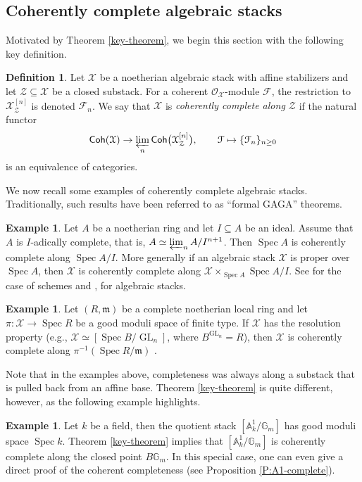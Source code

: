 \documentclass[a4paper]{amsart}
\theoremstyle{plain}
\theoremstyle{definition}
\newtheorem{definition}[theorem]{Definition}
\newtheorem{example}[theorem]{Example}
\theoremstyle{remark}
\numberwithin{equation}{section}
\newcommand{\sF}{\mathcal{F}} %
\newcommand{\fm}{\mathfrak{m}}
\newcommand{\GG}{\mathbb{G}}
\renewcommand\AA{\mathbb{A}}
\newcommand\cF{\mathcal{F}}
\newcommand\cX{\mathcal{X}}
\newcommand\cZ{\mathcal{Z}}
\newcommand\oh{\mathcal{O}}
\newcommand\Coh{\mathsf{Coh}}
\DeclareMathOperator{\Spec}{Spec}
\DeclareMathOperator{\GL}{GL}
\newcommand{\ilim}{\varprojlim}
\begin{document}
\subsection{Coherently complete algebraic stacks} \label{S:cc}
Motivated by Theorem \ref{key-theorem}, we begin this section with the following key definition. 
\begin{definition} \label{D:cc}
Let $\cX$ be a noetherian algebraic stack with affine stabilizers and let $\cZ \subseteq \cX$ be a closed substack. For a coherent $\oh_\cX$-module $\sF$, the restriction to $\cX_{\cZ}^{[n]}$ is denoted $\sF_n$.
We say that $\cX$ is {\it coherently complete along $\cZ$} if the natural functor
\[
\Coh(\cX)  \to  \ilim_n \Coh\bigl(\cX_{\cZ}^{[n]}\bigr), \qquad \sF\mapsto \{\cF_n\}_{n\geq 0}
\]
is an equivalence of categories.
 \end{definition}
 We now recall some examples of coherently complete algebraic
 stacks. Traditionally, such results have been referred to as ``formal
 GAGA'' theorems. 
 \begin{example}\label{E:cc}
   Let $A$ be a noetherian ring and let $I \subseteq A$ be an
   ideal. Assume that $A$ is $I$-adically complete, that is,
   $A\simeq \varprojlim_n A/I^{n+1}$.  Then $\Spec A$ is coherently
   complete along $\Spec A/I$. More generally if an algebraic stack
   $\cX$ is proper over $\Spec A$, then $\cX$ is coherently complete
   along $\cX \times_{\Spec A} \Spec A /I$. See \cite[III.5.1.4]{EGA}
   for the case of schemes and \cite[Thm.~1.4]{olsson-proper},
   \cite[Thm.~4.1]{conrad-gaga} for algebraic stacks.
\end{example}
\begin{example}\label{E:gzb}
  Let $(R,\fm)$ be a complete noetherian local ring and let
  $\pi\colon \cX \to \Spec R$ be a good moduli space of finite
  type. If $\cX$ has the resolution property (e.g.,
  $\cX \simeq [\Spec B/\GL_n]$, where $B^{\GL_n}=R$), then $\cX$ is
  coherently complete along $\pi^{-1}(\Spec R/\fm)$ \cite[Thm.~1.1]{geraschenko-brown}. 
\end{example}
Note that in the examples above, completeness was always along a
substack that is pulled back from an affine base. Theorem
\ref{key-theorem} is quite different, however, as the following
example highlights.
\begin{example}
  Let $k$ be a field, then the quotient stack $[\AA^1_k/\GG_m]$ has
  good moduli space $\Spec k$. Theorem \ref{key-theorem} implies that
  $[\AA^1_k/\GG_m]$ is coherently complete along the closed point
  $B\GG_m$. In this special case, one can even give a direct proof of
  the coherent completeness (see Proposition \ref{P:A1-complete}).
\end{example}
\end{document}
